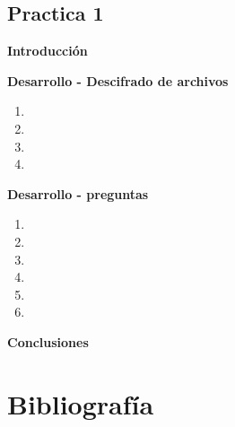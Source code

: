 \documentclass[11pt,letterpaper]{article}
\begin{document}
	
    
    
    \begin{center}
	\section*{\LARGE{Practica 1}}
    \end{center}

    \begin{center}
        \LARGE{\textbf{Introducción}}\\
    \end{center}
    \normalsize
    

    \newpage
    \begin{center}
        \LARGE{\textbf{Desarrollo - Descifrado de archivos}}\\
    \end{center}
    \normalsize
    \begin{enumerate}
        \item 
        \item 
        \item 
        \item 
    \end{enumerate}
    
    \newpage
    \begin{center}
        \LARGE{\textbf{Desarrollo - preguntas}}\\
    \end{center}
    \normalsize
    \begin{enumerate}
        \item 
        \item 
        \item 
        \item 
        \item 
        \item 
    \end{enumerate}

    \newpage
    \begin{center}
        \LARGE{\textbf{Conclusiones}}\\
    \end{center}
    \normalsize
    

    
\newpage

\Large \section*{Bibliografía}
  
  
  
    
	
\end{document}
